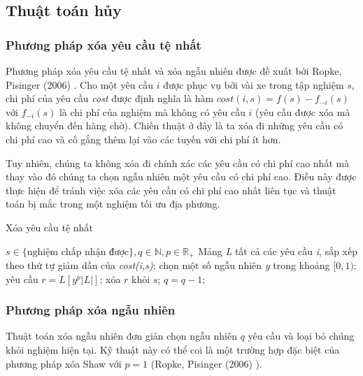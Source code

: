 \subsection{Thuật toán hủy}

\subsubsection*{Phương pháp xóa yêu cầu tệ nhất} 
Phương pháp xóa yêu cầu tệ nhất và xóa ngẫu nhiên được đề xuất bởi Ropke, Pisinger (2006) \cite{ropke2006adaptive}. Cho một yêu cầu $i$ được phục vụ bởi vài xe trong tập nghiệm $s$, chi phí của yêu cầu \textit{cost} được định nghĩa là hàm $cost(i,s)=f(s)-f_{-i}(s)$ với $f_{-i}(s)$ là chi phí của nghiệm mà không có yêu cầu $i$ (yêu cầu được xóa mà không chuyển đến hàng chờ). Chiến thuật ở đây là ta xóa đi những yêu cầu có chi phí cao và cố gắng thêm lại vào các tuyến với chi phí ít hơn.

Tuy nhiên, chúng ta không xóa đi chính xác các yêu cầu có chi phí cao nhất mà thay vào đó chúng ta chọn ngẫu nhiên một yêu cầu có chi phí cao. Điều này được thực hiện để tránh việc xóa các yêu cầu có chi phí cao nhất liên tục và thuật toán bị mắc trong một nghiệm tối ưu địa phương.

\begin{algorithm}
	\label{alg:worst_removal}
	\caption{Xóa yêu cầu tệ nhất}
	\begin{algorithmic}[1]
		\Require $s \in \text{\{nghiệm chấp nhận được\}}, q \in \mathbb{N}, p \in \mathbb{R}_{+}$
		\State Mảng \textit{L} tất cả các yêu cầu \textit{i}, sắp xếp theo thứ tự giảm dần của \textit{cost(i,s)};
		\State chọn một số ngẫu nhiên \textit{y} trong khoảng $[0, 1)$;
		\State yêu cầu $r = L\left[ y^p |L| \right]$;
		\State xóa $r$ khỏi $s$;
		\State $q = q-1$;
		\EndWhile
	\end{algorithmic}
\end{algorithm}

\subsubsection*{Phương pháp xóa ngẫu nhiên}
Thuật toán xóa ngẫu nhiên đơn giản chọn ngẫu nhiên $q$ yêu cầu và loại bỏ chúng khỏi nghiệm hiện tại. Kỹ thuật này có thể coi là một trường hợp đặc biệt của phương pháp xóa Shaw với $p=1$ (Ropke, Pisinger (2006) \cite{ropke2006adaptive}).

